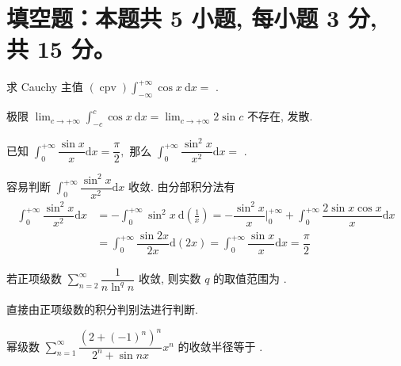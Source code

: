 \section{填空题：本题共 5 小题, 每小题 3 分, 共 15 分。}



\begin{question}
求 Cauchy 主值 $\displaystyle (\operatorname{cpv})\int_{-\infty}^{+\infty} \cos x ~ \mathrm{d}x =$ \fillin[发散].
\end{question}

\begin{solution}
极限 $\displaystyle \lim_{c\to+\infty} \int_{-c}^{c} \cos x ~ \mathrm{d}x = \lim_{c\to+\infty} 2\sin c$ 不存在, 发散.
\end{solution}

\begin{question}
已知 $\displaystyle \int_0^{+\infty} \dfrac{\sin x}{x} \mathrm{d}x = \dfrac{\pi}{2},$ 那么 $\displaystyle \int_0^{+\infty} \dfrac{\sin^2 x}{x^2} \mathrm{d}x =$ \fillin[$\dfrac{\pi}{2}$].
\end{question}

\begin{solution}
容易判断 $\displaystyle \int_0^{+\infty} \dfrac{\sin^2 x}{x^2} \mathrm{d}x$ 收敛. 由分部积分法有
\begin{align*}
\int_0^{+\infty} \dfrac{\sin^2 x}{x^2} \mathrm{d}x & = - \int_0^{+\infty} \sin^2 x ~\mathrm{d} \left(\frac{1}{x}\right) = - \dfrac{\sin^2 x}{x} \bigg|_0^{+\infty} + \int_0^{+\infty} \dfrac{2\sin x \cos x}{x} \mathrm{d}x \\
& = \int_0^{+\infty} \dfrac{\sin 2x}{2x} \mathrm{d}(2x) = \int_0^{+\infty} \dfrac{\sin x}{x} \mathrm{d}x = \dfrac{\pi}{2}
\end{align*}
\end{solution}

\begin{question}
若正项级数 $\displaystyle \sum_{n=2}^\infty \dfrac{1}{n \ln^q n}$ 收敛, 则实数 $q$ 的取值范围为 \fillin[$q > 1$].
\end{question}

\begin{solution}
直接由正项级数的积分判别法进行判断.
\end{solution}

\begin{question}
幂级数 $\displaystyle \sum\limits_{n=1}^{\infty} \dfrac{\left( 2 + (-1)^n \right)^n}{2^n + \sin nx} x^n$ 的收敛半径等于 \fillin[$\dfrac{2}{3}$].
\end{question}

